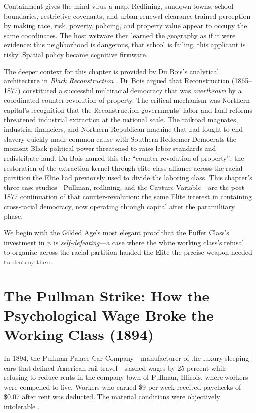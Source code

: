Containment gives the mind virus a map. Redlining, sundown towns, school boundaries, restrictive covenants, and urban-renewal clearance trained perception by making race, risk, poverty, policing, and property value appear to occupy the same coordinates. The host wetware then learned the geography as if it were evidence: this neighborhood is dangerous, that school is failing, this applicant is risky. Spatial policy became cognitive firmware.

The deeper context for this chapter is provided by Du Bois's analytical architecture in \textit{Black Reconstruction} \cite{dubois}. Du Bois argued that Reconstruction (1865--1877) constituted a successful multiracial democracy that was \textit{overthrown} by a coordinated counter-revolution of property. The critical mechanism was Northern capital's recognition that the Reconstruction governments' labor and land reforms threatened industrial extraction at the national scale. The railroad magnates, industrial financiers, and Northern Republican machine that had fought to end slavery quickly made common cause with Southern Redeemer Democrats the moment Black political power threatened to raise labor standards and redistribute land. Du Bois named this the ``counter-revolution of property'': the restoration of the extraction kernel through elite-class alliance across the racial partition the Elite had previously used to divide the laboring class. This chapter's three case studies---Pullman, redlining, and the Capture Variable---are the post-1877 continuation of that counter-revolution: the same Elite interest in containing cross-racial democracy, now operating through capital after the paramilitary phase.

We begin with the Gilded Age's most elegant proof that the Buffer Class's investment in $\psi$ is \textit{self-defeating}---a case where the white working class's refusal to organize across the racial partition handed the Elite the precise weapon needed to destroy them.

\section{The Pullman Strike: How the Psychological Wage Broke the Working Class (1894)}

In 1894, the Pullman Palace Car Company---manufacturer of the luxury sleeping cars that defined American rail travel---slashed wages by 25 percent while refusing to reduce rents in the company town of Pullman, Illinois, where workers were compelled to live. Workers who earned \$9 per week received paychecks of \$0.07 after rent was deducted. The material conditions were objectively intolerable \cite{lindsey_pullman, salvatore_debs}.

